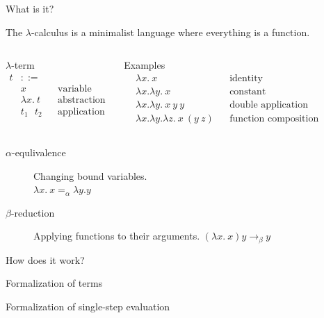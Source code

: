 \documentclass{beamer}
\begin{document}
\begin{frame}{What is it?}
  \begin{definition}
    The $\lambda$-calculus is a minimalist language where everything is a function.
  \end{definition}
  \begin{columns}[c]
    \footnotesize
    \begin{block}{$\lambda$-term}
      \begin{align}
        t & ::= \\
          & x && \text{variable} \\
          & \lambda x. \ t && \text{abstraction} \\
          & t_1 \text{ } t_2 && \text{application}
      \end{align}
    \end{block}
    \begin{block}{Examples}
      \begin{align*}
        & \lambda x. \ x && \text{identity} \\
        & \lambda x. \lambda y. \ x && \text{constant} \\
        & \lambda x. \lambda y. \ x \ y \ y && \text{double application} \\
        & \lambda x. \lambda y. \lambda z. \ x \ (y \ z) && \text{function composition}
      \end{align*}
    \end{block}
  \end{columns}
  \begin{description}
    \item[$\alpha$-equlivalence] Changing bound variables. \\
      $\lambda x. \ x =_\alpha \lambda y. y$
    \item[$\beta$-reduction] Applying functions to their arguments.
      $(\lambda x. \ x) y \to_\beta y$
  \end{description}
\end{frame}

\begin{frame}{How does it work?}
\end{frame}

\begin{frame}{Formalization of terms}
\end{frame}

\begin{frame}{Formalization of single-step evaluation}
\end{frame}
\end{document}
